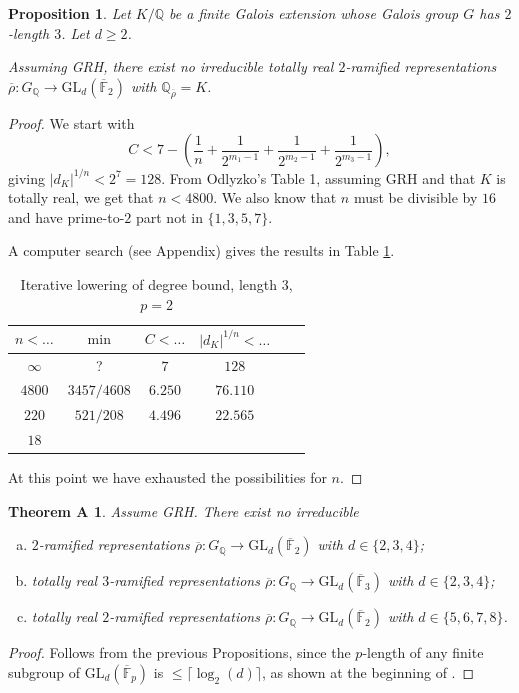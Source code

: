 \documentclass{amsart}
\newtheorem{prop}[theorem]{Proposition}
\newtheorem*{theoremA}{Theorem A}
\theoremstyle{definition}
\newcommand{\lra}{\longrightarrow}
\newcommand{\Q}{\mathbb{Q}}
\newcommand{\F}{\mathbb{F}}
\newcommand{\bF}{\overline{\F}}
\newcommand{\br}{\overline{\rho}}
\newcommand{\GL}{\mathrm{GL}}
\renewcommand{\geq}{\geqslant}
\renewcommand{\leq}{\leqslant}
\begin{document}
\begin{prop}\label{prop:length3}
  Let $K/\Q$ be a finite Galois extension whose Galois group $G$ has $2$-length $3$.
  Let $d\geq 2$.

  Assuming GRH, there exist no irreducible totally real $2$-ramified representations $\br:G_\Q\lra\GL_d(\bF_2)$ with $\Q_{\br}=K$.
\end{prop}
\begin{proof}
  We start with
  \begin{equation*}
    C < 7 - \left(\frac{1}{n}+\frac{1}{2^{m_1-1}}+\frac{1}{2^{m_2-1}}+\frac{1}{2^{m_3-1}}\right),
  \end{equation*}
  giving $|d_K|^{1/n}<2^7=128$.
  From Odlyzko's Table 1, assuming GRH and that $K$ is totally real, we get that $n<4800$.
  We also know that $n$ must be divisible by $16$ and have prime-to-$2$ part not in $\{1,3,5,7\}$.

  A computer search (see Appendix) gives the results in Table \ref{tab_length3}.

  \begin{table}[h]
    \begin{tabular}{cccccl}
      \toprule
      $n<\dots$ & $\min$      & $C<\dots$ & $|d_K|^{1/n}<\dots$ \\ \midrule
      $\infty$  & ?           & $7$       & $128$               \\
      $4800$    & $3457/4608$ & $6.250$   & $76.110$            \\
      $220$     & $521/208$   & $4.496$   & $22.565$            \\
      $18$                                                      \\
      \bottomrule
    \end{tabular}
    \caption{Iterative lowering of degree bound, length $3$, $p=2$}
    \label{tab_length3}
  \end{table}

  At this point we have exhausted the possibilities for $n$.
\end{proof}

\begin{theoremA}
  Assume GRH.
  There exist no irreducible
  \begin{enumerate}[(a)]
    \item  $2$-ramified representations $\br:G_\Q\lra\GL_d(\bF_2)$ with $d\in\{2,3,4\}$;

    \item totally real $3$-ramified representations $\br:G_\Q\lra\GL_d(\bF_3)$ with $d\in\{2,3,4\}$;

    \item totally real $2$-ramified representations $\br:G_\Q\lra\GL_d(\bF_2)$ with $d\in\{5,6,7,8\}$.
  \end{enumerate}
\end{theoremA}
\begin{proof}
  Follows from the previous Propositions, since the $p$-length of any finite subgroup of $\GL_d(\bF_p)$ is $\leq\lceil \log_2(d)\rceil$, as shown at the beginning of \cite[Section 3]{Mo1}.
\end{proof}
\end{document}
